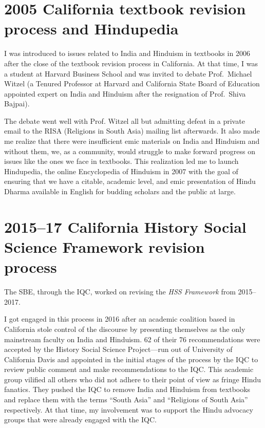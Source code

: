 \section*{2005 California textbook revision process and Hindupedia}

I was introduced to issues related to India and Hinduism in textbooks in 2006 after the close of the textbook revision process in California. At that time, I was a student at Harvard Business School and was invited to debate Prof.\ Michael Witzel (a Tenured Professor at Harvard and California State Board of Education appointed expert on India and Hinduism after the resignation of Prof.\ Shiva Bajpai).

The debate went well with Prof. Witzel all but admitting defeat in a private email to the RISA (Religions in South Asia) mailing list afterwards. It also made me realize that there were insufficient emic materials on India and Hinduism and without them, we, as a community, would struggle to make forward progress on issues like the ones we face in textbooks. This realization led me to launch Hindupedia, the online Encyclopedia of Hinduism in 2007 with the goal of ensuring that we have a citable, academic level, and emic presentation of Hindu Dharma available in English for budding scholars and the public at large. 

\section*{2015--17 California History Social Science Framework revision process}

The SBE, through the IQC, worked on revising the \textit{HSS Framework} from 2015--2017.

I got engaged in this process in 2016 after an academic coalition based in California stole control of the discourse by presenting themselves as the only mainstream faculty on India and Hinduism. 62 of their 76 recommendations were accepted by the History Social Science Project—run out of University of California Davis and appointed in the initial stages of the process by the IQC to review public comment and make recommendations to the IQC. This academic group vilified all others who did not adhere to their point of view as fringe Hindu fanatics. They pushed the IQC to remove India and Hinduism from textbooks and replace them with the terms “South Asia” and “Religions of South Asia” respectively. At that time, my involvement was to support the Hindu advocacy groups that were already engaged with the IQC. 


